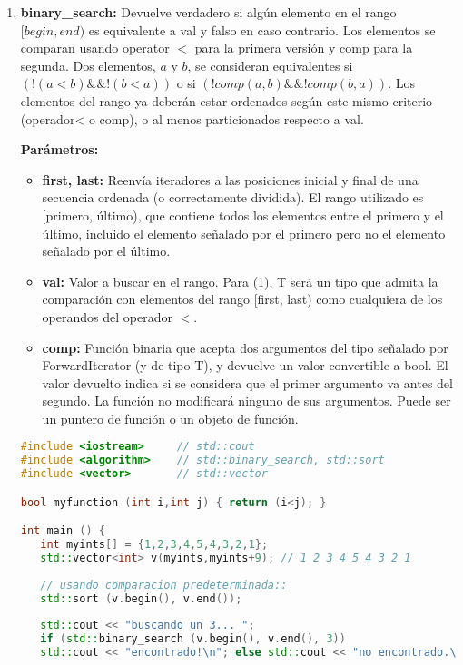 \begin{enumerate}
\item \textbf{binary\_search:} Devuelve verdadero si algún elemento en el rango $[begin, end)$ es equivalente a val y falso en caso contrario. Los elementos se comparan usando operator $<$ para la primera versión y comp para la segunda. Dos elementos, $a$ y $b$, se consideran equivalentes si $(!(a<b) \&\& !(b<a))$ o si $(!comp(a,b) \&\& !comp(b,a))$. Los elementos del rango ya deberán estar ordenados según este mismo criterio (operador< o comp), o al menos particionados respecto a val.

\textbf{Parámetros:}

\begin{itemize}
	\item \textbf{first, last:} Reenvía iteradores a las posiciones inicial y final de una secuencia ordenada (o correctamente dividida). El rango utilizado es [primero, último), que contiene todos los elementos entre el primero y el último, incluido el elemento señalado por el primero pero no el elemento señalado por el último.
	
	
	\item \textbf{val:} Valor a buscar en el rango. Para (1), T será un tipo que admita la comparación con elementos del rango [first, last) como cualquiera de los operandos del operador $<$.
	
	\item \textbf{comp:} Función binaria que acepta dos argumentos del tipo señalado por ForwardIterator (y de tipo T), y devuelve un valor convertible a bool. El valor devuelto indica si se considera que el primer argumento va antes del segundo. La función no modificará ninguno de sus argumentos. Puede ser un puntero de función o un objeto de función. 
\end{itemize} 

\begin{lstlisting}[language=C++]
#include <iostream>     // std::cout
#include <algorithm>    // std::binary_search, std::sort
#include <vector>       // std::vector

bool myfunction (int i,int j) { return (i<j); }

int main () {
   int myints[] = {1,2,3,4,5,4,3,2,1};
   std::vector<int> v(myints,myints+9); // 1 2 3 4 5 4 3 2 1
	
   // usando comparacion predeterminada::
   std::sort (v.begin(), v.end());
	
   std::cout << "buscando un 3... ";
   if (std::binary_search (v.begin(), v.end(), 3))
   std::cout << "encontrado!\n"; else std::cout << "no encontrado.\n";
	

\end{lstlisting}
\end{enumerate}
